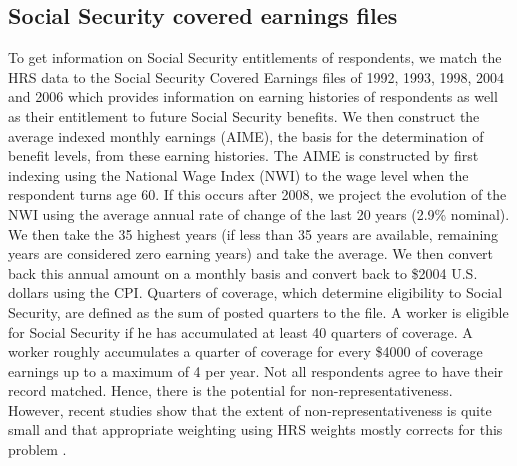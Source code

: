 \subsection{Social Security covered earnings files}
To get information on Social Security entitlements of respondents, we match the HRS data to the 
Social Security Covered Earnings files of 1992, 1993, 1998, 2004 and 2006 which provides information on 
earning histories of respondents as well as their entitlement to future Social Security benefits. We 
then construct the average indexed monthly earnings (AIME), the basis for the determination of benefit 
levels, from these earning histories. The AIME is constructed by first indexing using the National 
Wage Index (NWI) to the wage level when the respondent turns age 60. If this occurs after 2008, we 
project the evolution of the NWI using the average annual rate of change of the last 20 years (2.9\% 
nominal). We then take the 35 highest years (if less than 35 years are available, remaining years are 
considered zero earning years) and take the average. We then convert back this annual amount on a 
monthly basis and convert back to \$2004 U.S. dollars using the CPI. Quarters of coverage, which 
determine eligibility to Social Security, are defined as the sum of posted quarters to the file. A 
worker is eligible for Social Security if he has accumulated at least 40 quarters of coverage. A 
worker roughly accumulates a quarter of coverage for every \$4000 of coverage earnings up to a maximum 
of 4 per year. Not all respondents agree to have their record matched. Hence, there is the potential 
for non-representativeness. However, recent studies show that the extent of non-representativeness is 
quite small and that appropriate weighting using HRS weights mostly corrects for this problem 
\citep{kapteyn2006effects}.